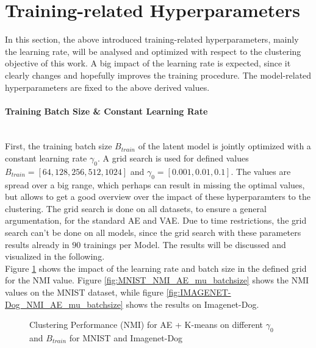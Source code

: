 \documentclass[12pt,DIV14,BCOR12mm,a4paper,footexclude,headinclude,halfparskip-,twoside,openright,cleardoubleempty,idxtotoc,bibtotoc,listtotoc,abstracton]{scrreprt} %
\numberwithin{equation}{chapter}
\begin{document}
\section{Training-related Hyperparameters}
In this section, the above introduced training-related hyperparameters, mainly the learning rate, will be analysed and optimized with respect to the clustering objective of this work. A big impact of the learning rate is expected, since it clearly changes and hopefully improves the training procedure. The model-related hyperparameters are fixed to the above derived values.
\paragraph{Training Batch Size \& Constant Learning Rate}\hfill \\
First, the training batch size $B_{train}$ of the latent model is jointly optimized with a constant learning rate $\gamma_0$. A grid search is used for defined values $B_{train} = [64, 128, 256, 512, 1024]$ and $\gamma_0 = [0.001, 0.01, 0.1]$. The values are spread over a big range, which perhaps can result in missing the optimal values, but allows to get a good overview over the impact of these hyperparamters to the clustering. The grid search is done on all datasets, to ensure a general argumentation, for the standard AE and VAE. Due to time restrictions, the grid search can't be done on all models, since the grid search with these parameters results already in $90$ trainings per Model. The results will be discussed and visualized in the following.\\
Figure \ref{fig:ClusterPerformance_AE_LearningRate_BatchSize} shows the impact of the learning rate and batch size in the defined grid for the NMI value. Figure \ref{fig:MNIST_NMI_AE_mu_batchsize} shows the NMI values on the MNIST dataset, while figure \ref{fig:IMAGENET-Dog_NMI_AE_mu_batchsize} shows the results on Imagenet-Dog.
	 \begin{figure}[htb!]
		\centering
		\qquad
		\caption{Clustering Performance (NMI) for AE + K-means on different $\gamma_0$ and $B_{train}$ for MNIST and Imagenet-Dog}
		\label{fig:ClusterPerformance_AE_LearningRate_BatchSize}
	\end{figure}
\end{document}
